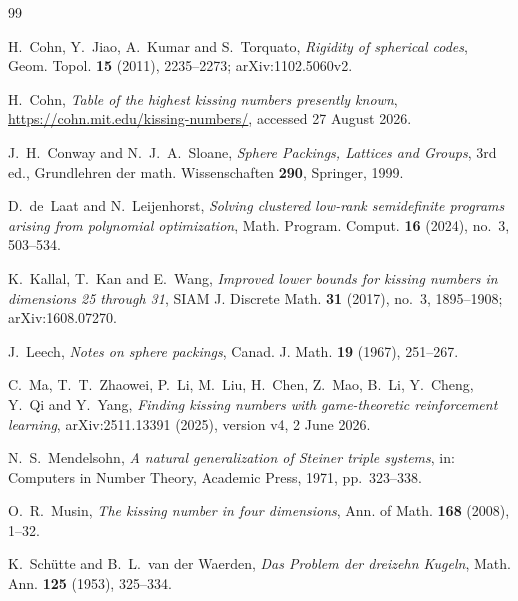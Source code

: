 \documentclass[11pt,reqno]{amsart}
\theoremstyle{plain}
\theoremstyle{remark}
\begin{document}
\begin{thebibliography}{99}

H.~Cohn, Y.~Jiao, A.~Kumar and S.~Torquato,
\emph{Rigidity of spherical codes},
Geom. Topol. \textbf{15} (2011), 2235--2273; arXiv:1102.5060v2.

H.~Cohn,
\emph{Table of the highest kissing numbers presently known},
\url{https://cohn.mit.edu/kissing-numbers/}, accessed 27 August 2026.

J.~H.~Conway and N.~J.~A.~Sloane,
\emph{Sphere Packings, Lattices and Groups}, 3rd ed.,
Grundlehren der math. Wissenschaften \textbf{290}, Springer, 1999.

D.~de~Laat and N.~Leijenhorst,
\emph{Solving clustered low-rank semidefinite programs arising from polynomial
optimization},
Math. Program. Comput. \textbf{16} (2024), no.~3, 503--534.

K.~Kallal, T.~Kan and E.~Wang,
\emph{Improved lower bounds for kissing numbers in dimensions 25 through 31},
SIAM J. Discrete Math. \textbf{31} (2017), no.~3, 1895--1908; arXiv:1608.07270.

J.~Leech,
\emph{Notes on sphere packings},
Canad. J. Math. \textbf{19} (1967), 251--267.

C.~Ma, T.~T.~Zhaowei, P.~Li, M.~Liu, H.~Chen, Z.~Mao, B.~Li, Y.~Cheng, Y.~Qi and
Y.~Yang,
\emph{Finding kissing numbers with game-theoretic reinforcement learning},
arXiv:2511.13391 (2025), version v4, 2 June 2026.

N.~S.~Mendelsohn,
\emph{A natural generalization of Steiner triple systems},
in: Computers in Number Theory, Academic Press, 1971, pp.~323--338.

O.~R.~Musin,
\emph{The kissing number in four dimensions},
Ann. of Math. \textbf{168} (2008), 1--32.

K.~Sch\"utte and B.~L.~van der Waerden,
\emph{Das Problem der dreizehn Kugeln},
Math. Ann. \textbf{125} (1953), 325--334.

\end{thebibliography}
\end{document}
